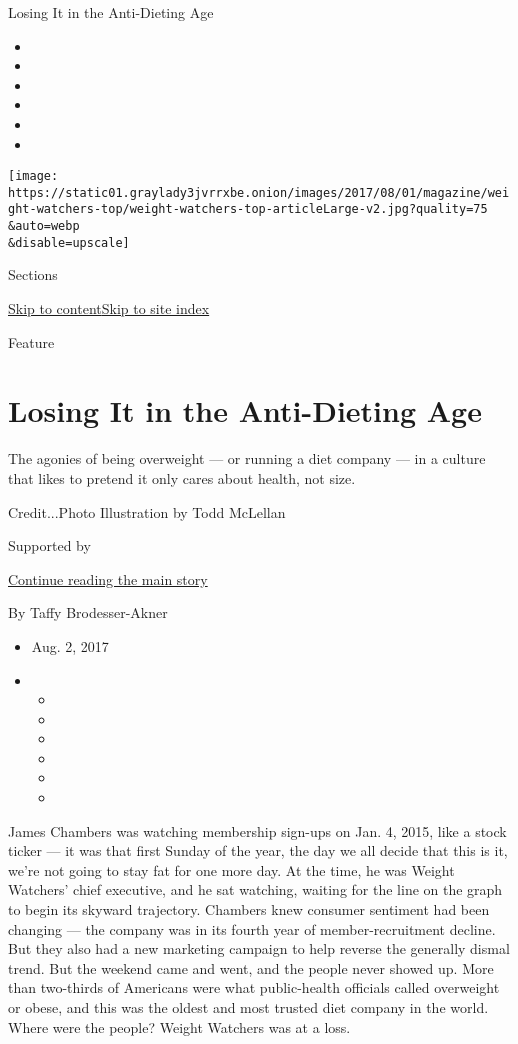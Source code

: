 Losing It in the Anti-Dieting Age

\begin{itemize}
\item
\item
\item
\item
\item
\item
\end{itemize}

\texttt{[image: https://static01.graylady3jvrrxbe.onion/images/2017/08/01/magazine/weight-watchers-top/weight-watchers-top-articleLarge-v2.jpg?quality=75\\\&auto=webp\\\&disable=upscale]}

Sections

\protect\hyperlink{site-content}{Skip to
content}\protect\hyperlink{site-index}{Skip to site index}

Feature

\hypertarget{losing-it-in-the-anti-dieting-age}{%
\section{Losing It in the Anti-Dieting
Age}\label{losing-it-in-the-anti-dieting-age}}

The agonies of being overweight --- or running a diet company --- in a
culture that likes to pretend it only cares about health, not size.

Credit...Photo Illustration by Todd McLellan

Supported by

\protect\hyperlink{after-sponsor}{Continue reading the main story}

By Taffy Brodesser-Akner

\begin{itemize}
\item
  Aug. 2, 2017
\item
  \begin{itemize}
  \item
  \item
  \item
  \item
  \item
  \item
  \end{itemize}
\end{itemize}

James Chambers was watching membership sign-ups on Jan. 4, 2015, like a
stock ticker --- it was that first Sunday of the year, the day we all
decide that this is it, we're not going to stay fat for one more day. At
the time, he was Weight Watchers' chief executive, and he sat watching,
waiting for the line on the graph to begin its skyward trajectory.
Chambers knew consumer sentiment had been changing --- the company was
in its fourth year of member-recruitment decline. But they also had a
new marketing campaign to help reverse the generally dismal trend. But
the weekend came and went, and the people never showed up. More than
two-thirds of Americans were what public-health officials called
overweight or obese, and this was the oldest and most trusted diet
company in the world. Where were the people? Weight Watchers was at a
loss.

